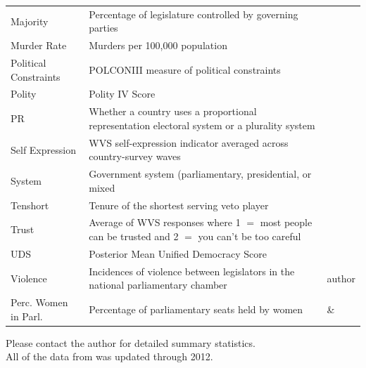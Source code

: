 \documentclass[a4paper]{article}\usepackage[]{graphicx}\usepackage[]{color}
\begin{document}
\begin{table}[!h]
\begin{center}
{\begin{tabular}{l m{7cm} m{3.5cm}}
            Majority & Percentage of legislature controlled by governing parties & \cite{DPI2001} \\
            Murder Rate & Murders per 100,000 population & \cite{UNMurder2013} \\
            Political Constraints & POLCONIII measure of political constraints & \cite[][updated through 2011]{Henisz2004} \\
            Polity & Polity IV Score & \cite{Marshall2009} \\
            PR & Whether a country uses a proportional representation electoral system or a plurality system & \cite{DPI2001} \\
            Self Expression & WVS self-expression indicator averaged across country-survey waves & \cite{WVS2009} \\
            System & Government system (parliamentary, presidential, or mixed & \cite{DPI2001} \\
            Tenshort & Tenure of the shortest serving veto player & \cite{DPI2001} \\
            Trust & Average of WVS responses where 1 $=$ most people can be trusted and 2 $=$ you can't be too careful & \cite{WVS2009} \\
            UDS & Posterior Mean Unified Democracy Score & \cite{Pemstein2010} \\
            Violence & Incidences of violence between legislators in the national parliamentary chamber & author \\
            Perc. Women in Parl. & Percentage of parliamentary seats held by women & \cite{WomParCrossNat} \& \cite{IPU2013} \\
            \hline

    \end{tabular}
    }
    \end{center}
    \begin{singlespace}
        Please contact the author for detailed summary statistics. \\
        All of the data from \cite{DPI2001} was updated through 2012.
    \end{singlespace}
\end{table}
\end{document}
